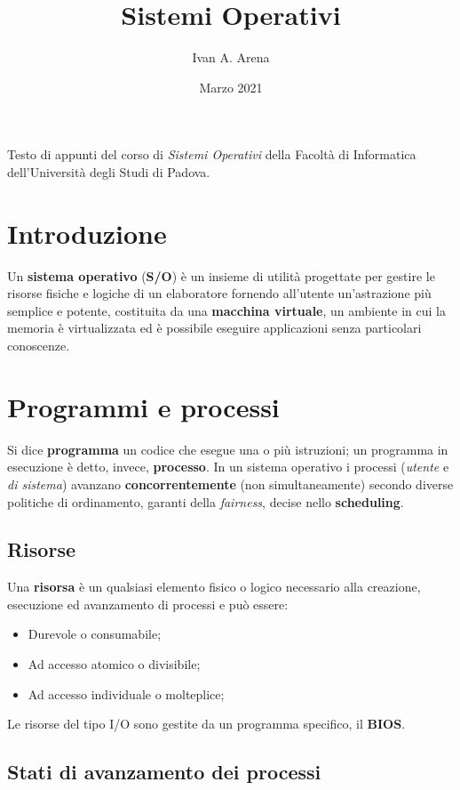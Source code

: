 \documentclass{article}
\title{Sistemi Operativi}
\author{Ivan A. Arena}
\date{Marzo 2021}
\begin{document}
\maketitle

\noindent Testo di appunti del corso di \textit{Sistemi Operativi} della Facoltà di Informatica dell'Università degli Studi di Padova.

\tableofcontents

\section{Introduzione} Un \textbf{sistema operativo} (\textbf{S/O}) è un insieme di utilità progettate per gestire le risorse fisiche e logiche di un elaboratore fornendo all'utente un'astrazione più semplice e potente, costituita da una \textbf{macchina virtuale}, un ambiente in cui la memoria è virtualizzata ed è possibile eseguire applicazioni senza particolari conoscenze. 

\section{Programmi e processi} Si dice \textbf{programma} un codice che esegue una o più istruzioni; un programma in esecuzione è detto, invece, \textbf{processo}. In un sistema operativo i processi (\textit{utente} e \textit{di sistema}) avanzano \textbf{concorrentemente} (non simultaneamente) secondo diverse politiche di ordinamento, garanti della \textit{fairness}, decise nello \textbf{scheduling}.

\subsection{Risorse} Una \textbf{risorsa} è un qualsiasi elemento fisico o logico necessario alla creazione, esecuzione ed avanzamento di processi e può essere: \begin{itemize}
    \item Durevole o consumabile;
    \item Ad accesso atomico o divisibile;
    \item Ad accesso individuale o molteplice;
\end{itemize} 
Le risorse del tipo I/O sono gestite da un programma specifico, il \textbf{BIOS}.

\subsection{Stati di avanzamento dei processi} 
\end{document}
